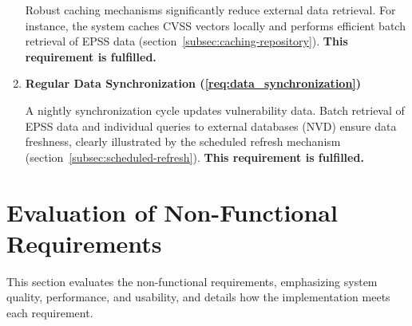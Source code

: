 \begin{enumerate}
    Robust caching mechanisms significantly reduce external data retrieval. For instance, the system caches \ac{CVSS} vectors locally and performs efficient batch retrieval of \ac{EPSS} data (section~\ref{subsec:caching-repository}). \textbf{This requirement is fulfilled.}
	      
    \newpage
	      
    \item \textbf{Regular Data Synchronization (\ref{req:data_synchronization})}
	      	      
    A nightly synchronization cycle updates vulnerability data. Batch retrieval of \ac{EPSS} data and individual queries to external databases (\ac{NVD}) ensure data freshness, clearly illustrated by the scheduled refresh mechanism (section~\ref{subsec:scheduled-refresh}). \textbf{This requirement is fulfilled.}
	      	      
\end{enumerate}

\section{Evaluation of Non-Functional Requirements}

This section evaluates the non-functional requirements, emphasizing system quality, performance, and usability, and details how the implementation meets each requirement.


